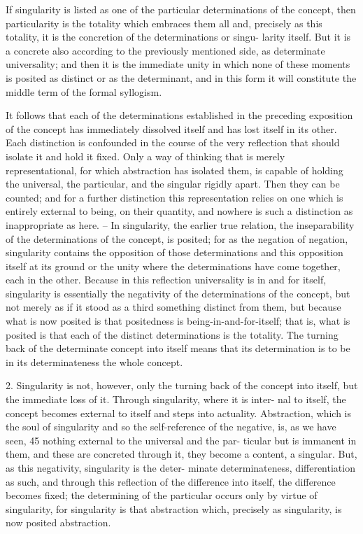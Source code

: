If singularity is listed as one of the particular determinations of the
concept, then particularity is the totality which embraces them all and,
precisely as this totality, it is the concretion of the determinations or singu-
larity itself. But it is a concrete also according to the previously mentioned
side, as determinate universality; and then it is the immediate unity in
which none of these moments is posited as distinct or as the determinant,
and in this form it will constitute the middle term of the formal syllogism.

It follows that each of the determinations established in the preceding
exposition of the concept has immediately dissolved itself and has lost
itself in its other. Each distinction is confounded in the course of the very
reflection that should isolate it and hold it fixed. Only a way of thinking that
is merely representational, for which abstraction has isolated them, is capable
of holding the universal, the particular, and the singular rigidly apart. Then
they can be counted; and for a further distinction this representation relies
on one which is entirely external to being, on their quantity, and nowhere
is such a distinction as inappropriate as here. – In singularity, the earlier
true relation, the inseparability of the determinations of the concept, is
posited; for as the negation of negation, singularity contains the opposition
of those determinations and this opposition itself at its ground or the unity
where the determinations have come together, each in the other. Because
in this reflection universality is in and for itself, singularity is essentially
the negativity of the determinations of the concept, but not merely as if it
stood as a third something distinct from them, but because what is now
posited is that positedness is being-in-and-for-itself; that is, what is posited is
that each of the distinct determinations is the totality. The turning back of
the determinate concept into itself means that its determination is to be in
its determinateness the whole concept.

2. Singularity is not, however, only the turning back of the concept into
itself, but the immediate loss of it. Through singularity, where it is inter-
nal to itself, the concept becomes external to itself and steps into actuality.
Abstraction, which is the soul of singularity and so the self-reference of the
negative, is, as we have seen, 45 nothing external to the universal and the par-
ticular but is immanent in them, and these are concreted through it, they
become a content, a singular. But, as this negativity, singularity is the deter-
minate determinateness, differentiation as such, and through this reflection
of the difference into itself, the difference becomes fixed; the determining
of the particular occurs only by virtue of singularity, for singularity is that
abstraction which, precisely as singularity, is now posited abstraction.

